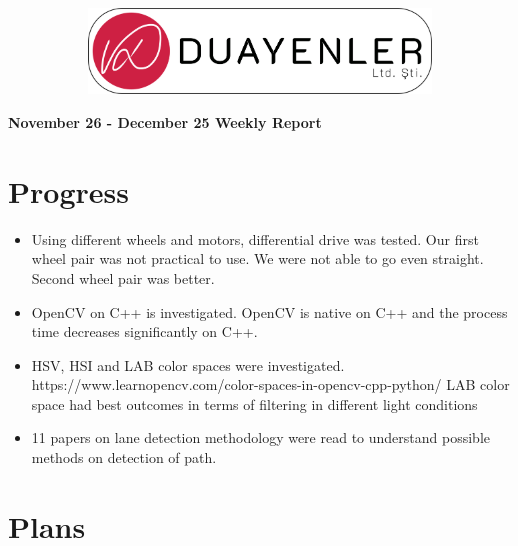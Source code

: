 \documentclass[a4paper,12pt]{article}
\begin{document}
	
\begin{figure}
	\vspace*{-.7cm}
	\centering
	\begin{figure}[H]
		\centering
		\setlength{\unitlength}{\textwidth} 
		\includegraphics[width=0.9\unitlength]{../../../Documents/logos/logo3-with-stroke}
	\end{figure}
\end{figure}
\vspace*{-1.7cm}
\begin{center}
	\Large\textbf{November 26 - December 25 Weekly Report}
	\end{center}



\section{Progress}
\begin{itemize}
	\item Using different wheels and motors, differential drive was tested.	
		\subitem * Our first wheel pair was not practical to use. We were not able to go even straight.
		\subitem * Second wheel pair was better.
	
	\item OpenCV on C++ is investigated.
		\subitem * OpenCV is native on C++ and the process time decreases significantly on C++.
	
	\item HSV, HSI and LAB color spaces were investigated.
		\subitem * https://www.learnopencv.com/color-spaces-in-opencv-cpp-python/
		\subitem * LAB color space had best outcomes in terms of filtering in different light conditions
	
	\item 11 papers on lane detection methodology were read to understand possible methods on detection of path.
 
\end{itemize}

\section{Plans}
\end{document}
